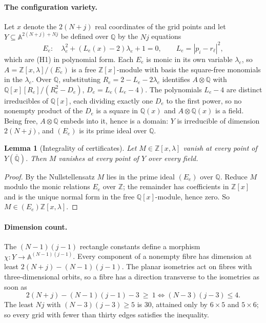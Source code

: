 \documentclass[11pt]{article}
\newtheorem{lemma}{Lemma}
\theoremstyle{remark}
\begin{document}
\paragraph{The configuration variety.}
Let $x$ denote the $2(N+j)$ real coordinates of the grid points and
let $Y\subseteq\mathbb A^{2(N+j)+Nj}$ be defined over $\mathbb Q$ by
the $Nj$ equations
\[
 E_e:\quad \lambda_e^2+(L_e(x)-2)\lambda_e+1=0,
 \qquad L_e=|p_i-r_\ell|^2 ,
\]
which are (H1) in polynomial form. Each $E_e$ is monic in its own
variable $\lambda_e$, so $A=\mathbb Z[x,\lambda]/(E_e)$ is a free
$\mathbb Z[x]$-module with basis the square-free monomials in the
$\lambda_e$. Over $\mathbb Q$, substituting
$R_e=2-L_e-2\lambda_e$ identifies $A\otimes\mathbb Q$ with
$\mathbb Q[x][R_e]/(R_e^2-D_e)$, $D_e=L_e(L_e-4)$. The polynomials
$L_e-4$ are distinct irreducibles of $\mathbb Q[x]$, each dividing
exactly one $D_e$ to the first power, so no nonempty product of the
$D_e$ is a square in $\mathbb Q(x)$ and $A\otimes\mathbb Q(x)$ is a
field. Being free, $A\otimes\mathbb Q$ embeds into it, hence is a
domain: $Y$ is irreducible of dimension $2(N+j)$, and $(E_e)$ is its
prime ideal over $\mathbb Q$.

\begin{lemma}[Integrality of certificates]
\label{lem:integral}
Let $M\in\mathbb Z[x,\lambda]$ vanish at every point of
$Y(\overline{\mathbb Q})$. Then $M$ vanishes at every point of $Y$
over every field.
\end{lemma}
\begin{proof}
By the Nullstellensatz $M$ lies in the prime ideal $(E_e)$ over
$\mathbb Q$. Reduce $M$ modulo the monic relations $E_e$ over
$\mathbb Z$; the remainder has coefficients in $\mathbb Z[x]$ and is
the unique normal form in the free $\mathbb Q[x]$-module, hence zero.
So $M\in(E_e)\mathbb Z[x,\lambda]$.
\end{proof}

\paragraph{Dimension count.}
The $(N-1)(j-1)$ rectangle constants define a morphism
$\chi:Y\to\mathbb A^{(N-1)(j-1)}$. Every component of a nonempty fibre
has dimension at least $2(N+j)-(N-1)(j-1)$. The planar isometries act
on fibres with three-dimensional orbits, so a fibre has a direction
transverse to the isometries as soon as
\[
 2(N+j)-(N-1)(j-1)-3\ \ge\ 1
 \iff (N-3)(j-3)\le4 .
\]
The least $Nj$ with $(N-3)(j-3)\ge5$ is $30$, attained only by
$6\times5$ and $5\times6$; so every grid with fewer than thirty edges
satisfies the inequality.
\end{document}
